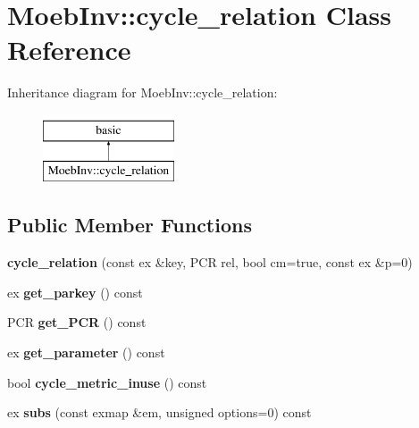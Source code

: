 \hypertarget{class_moeb_inv_1_1cycle__relation}{}\section{Moeb\+Inv\+:\+:cycle\+\_\+relation Class Reference}
\label{class_moeb_inv_1_1cycle__relation}
Inheritance diagram for Moeb\+Inv\+:\+:cycle\+\_\+relation\+:\begin{figure}[H]
\begin{center}
\leavevmode
\includegraphics[height=2.000000cm]{class_moeb_inv_1_1cycle__relation}
\end{center}
\end{figure}
\subsection*{Public Member Functions}
\begin{DoxyCompactItemize}
\item 
\mbox{\label{class_moeb_inv_1_1cycle__relation_a13d39ba6d4d94b9d33239fd6ac2816cd}} 
{\bfseries cycle\+\_\+relation} (const ex \&key, P\+CR rel, bool cm=true, const ex \&p=0)
\item 
\mbox{\label{class_moeb_inv_1_1cycle__relation_a124237c9fdf50d9d7acbf8b8ec06399b}} 
ex {\bfseries get\+\_\+parkey} () const
\item 
\mbox{\label{class_moeb_inv_1_1cycle__relation_a1e580ad7bc9d962b2adab5d22d8a308b}} 
P\+CR {\bfseries get\+\_\+\+P\+CR} () const
\item 
\mbox{\label{class_moeb_inv_1_1cycle__relation_a7940baf02b699b5e2cf93d11783b69ae}} 
ex {\bfseries get\+\_\+parameter} () const
\item 
\mbox{\label{class_moeb_inv_1_1cycle__relation_a740807052ab3613d29229cdbef0156c3}} 
bool {\bfseries cycle\+\_\+metric\+\_\+inuse} () const
\item 
\mbox{\label{class_moeb_inv_1_1cycle__relation_a660797b3b804d3d656f6456b8e6cca8d}} 
ex {\bfseries subs} (const exmap \&em, unsigned options=0) const
\end{DoxyCompactItemize}
